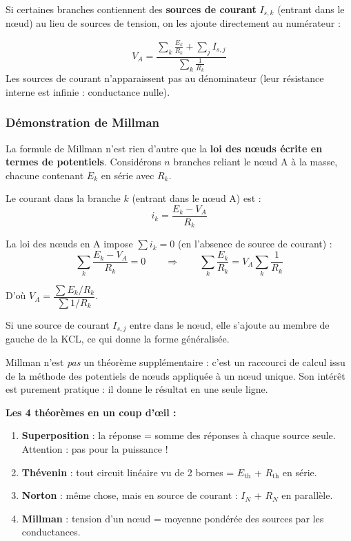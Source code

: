 \documentclass[12pt,a4paper,twoside]{book}
\begin{document}
Si certaines branches contiennent des \textbf{sources de courant} $I_{s,k}$ (entrant dans le n\oe ud) au lieu de sources de tension, on les ajoute directement au numérateur :

\begin{formule}
\[
\boxed{V_A = \frac{\displaystyle\sum_{k} \frac{E_k}{R_k} + \sum_{j} I_{s,j}}{\displaystyle\sum_{k} \frac{1}{R_k}}}
\]
Les sources de courant n'apparaissent pas au dénominateur (leur résistance interne est infinie : conductance nulle).
\end{formule}

\subsubsection*{Démonstration de Millman}

La formule de Millman n'est rien d'autre que la \textbf{loi des n\oe uds écrite en termes de potentiels}. Considérons $n$ branches reliant le n\oe ud A à la masse, chacune contenant $E_k$ en série avec $R_k$.

Le courant dans la branche $k$ (entrant dans le n\oe ud A) est :
\[
i_k = \frac{E_k - V_A}{R_k}
\]

La loi des n\oe uds en A impose $\sum i_k = 0$ (en l'absence de source de courant) :
\[
\sum_{k} \frac{E_k - V_A}{R_k} = 0 \qquad \Longrightarrow \qquad \sum_k \frac{E_k}{R_k} = V_A \sum_k \frac{1}{R_k}
\]

D'où $V_A = \dfrac{\sum E_k/R_k}{\sum 1/R_k}$. \checkmark

Si une source de courant $I_{s,j}$ entre dans le n\oe ud, elle s'ajoute au membre de gauche de la KCL, ce qui donne la forme généralisée.

\begin{intuition}
Millman n'est \textit{pas} un théorème supplémentaire : c'est un raccourci de calcul issu de la méthode des potentiels de n\oe uds appliquée à un n\oe ud unique. Son intérêt est purement pratique : il donne le résultat en une seule ligne.
\end{intuition}

\begin{retenir}
\textbf{Les 4 théorèmes en un coup d'\oe il :}
\begin{enumerate}[nosep]
\item \textbf{Superposition} : la réponse = somme des réponses à chaque source seule. Attention : pas pour la puissance !
\item \textbf{Thévenin} : tout circuit linéaire vu de 2 bornes = $E_{\text{th}}$ + $R_{\text{th}}$ en série.
\item \textbf{Norton} : même chose, mais en source de courant : $I_N$ + $R_N$ en parallèle.
\item \textbf{Millman} : tension d'un n\oe ud = moyenne pondérée des sources par les conductances.
\end{enumerate}
\end{retenir}
\end{document}

